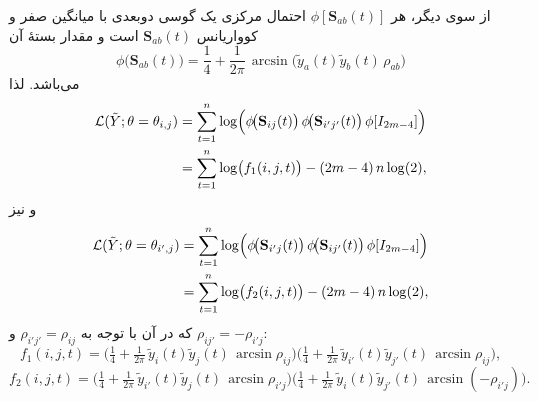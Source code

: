 \begin{اثبات}
	از سوی دیگر، هر \(\phi[\mathbf{S}_{ab}(t)]\) احتمال  مرکزی یک گوسی دوبعدی با میانگین صفر و کوواریانس \(\mathbf{S}_{ab}(t)\) است و مقدار بستهٔ آن
	\begin{equation}
	\phi\!\big(\mathbf{S}_{ab}(t)\big)
	=\frac{1}{4}+\frac{1}{2\pi}\,\arcsin\!\big(\tilde y_a(t)\tilde y_b(t)\,\rho_{ab}\big)
	\end{equation}
	می‌باشد. لذا
	\begin{align}
	\mathcal{L}(\tilde Y;\theta=\theta_{i,j})
	&=\sum_{t=1}^{n}\log\!\Big(\phi\!\big(\mathbf{S}_{ij}(t)\big)\,\phi\!\big(\mathbf{S}_{i'j'}(t)\big)\,\phi[I_{2m-4}]\Big) \notag \\
	&=\sum_{t=1}^{n}\log\!\big(f_1(i,j,t)\big)-(2m-4)\,n\log(2),
	\end{align}
	و نیز
	\begin{align}
	\mathcal{L}(\tilde Y;\theta=\theta_{i',j})
	&=\sum_{t=1}^{n}\log\!\Big(\phi\!\big(\mathbf{S}_{i'j}(t)\big)\,\phi\!\big(\mathbf{S}_{ij'}(t)\big)\,\phi[I_{2m-4}]\Big) \notag \\
	&=\sum_{t=1}^{n}\log\!\big(f_2(i,j,t)\big)-(2m-4)\,n\log(2),
	\end{align}
	که در آن با توجه به \(\rho_{i'j'}=\rho_{ij}\) و \(\rho_{ij'}=-\rho_{i'j}\):
	\begin{equation}
	f_1(i,j,t)=\Big(\tfrac{1}{4}+\tfrac{1}{2\pi}\,\tilde y_i(t)\tilde y_j(t)\,\arcsin\rho_{ij}\Big)
	\Big(\tfrac{1}{4}+\tfrac{1}{2\pi}\,\tilde y_{i'}(t)\tilde y_{j'}(t)\,\arcsin\rho_{ij}\Big),
	\end{equation}
	\begin{equation}
	f_2(i,j,t)=\Big(\tfrac{1}{4}+\tfrac{1}{2\pi}\,\tilde y_{i'}(t)\tilde y_{j}(t)\,\arcsin\rho_{i'j}\Big)
	\Big(\tfrac{1}{4}+\tfrac{1}{2\pi}\,\tilde y_{i}(t)\tilde y_{j'}(t)\,\arcsin(-\rho_{i'j})\Big).
	\end{equation}
	

\end{اثبات}
